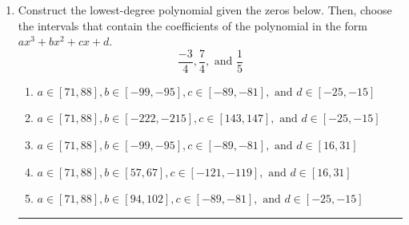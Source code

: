 \documentclass[14pt]{extbook}
\newcommand{\litem}[1]{\item#1\hspace*{-1cm}\rule{\textwidth}{0.4pt}}
\begin{document}
\begin{enumerate}
\litem{
Construct the lowest-degree polynomial given the zeros below. Then, choose the intervals that contain the coefficients of the polynomial in the form $ax^3+bx^2+cx+d$.\[ \frac{-3}{4}, \frac{7}{4}, \text{ and } \frac{1}{5} \]\begin{enumerate}[label=\Alph*.]
\item \( a \in [71, 88], b \in [-99, -95], c \in [-89, -81], \text{ and } d \in [-25, -15] \)
\item \( a \in [71, 88], b \in [-222, -215], c \in [143, 147], \text{ and } d \in [-25, -15] \)
\item \( a \in [71, 88], b \in [-99, -95], c \in [-89, -81], \text{ and } d \in [16, 31] \)
\item \( a \in [71, 88], b \in [57, 67], c \in [-121, -119], \text{ and } d \in [16, 31] \)
\item \( a \in [71, 88], b \in [94, 102], c \in [-89, -81], \text{ and } d \in [-25, -15] \)


\end{enumerate}}
\end{enumerate}
\end{document}
